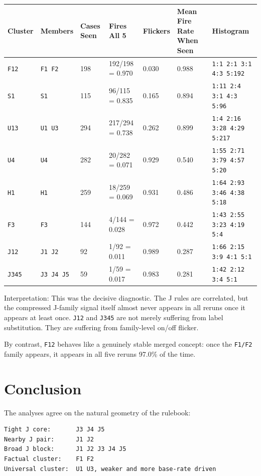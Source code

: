 \documentclass[11pt]{article}
\begin{document}
\begingroup
\small
\begin{longtable}{L{0.10\textwidth} L{0.12\textwidth} R{0.09\textwidth} R{0.16\textwidth} R{0.09\textwidth} R{0.13\textwidth} L{0.22\textwidth}}
\toprule
Cluster & Members & Cases Seen & Fires All 5 & Flickers & Mean Fire Rate When Seen & Histogram \\
\midrule
\endhead
\texttt{F12} & \texttt{F1 F2} & 198 & 192/198 = 0.970 & 0.030 & 0.988 & \texttt{1:1 2:1 3:1 4:3 5:192} \\
\texttt{S1} & \texttt{S1} & 115 & 96/115 = 0.835 & 0.165 & 0.894 & \texttt{1:11 2:4 3:1 4:3 5:96} \\
\texttt{U13} & \texttt{U1 U3} & 294 & 217/294 = 0.738 & 0.262 & 0.899 & \texttt{1:4 2:16 3:28 4:29 5:217} \\
\texttt{U4} & \texttt{U4} & 282 & 20/282 = 0.071 & 0.929 & 0.540 & \texttt{1:55 2:71 3:79 4:57 5:20} \\
\texttt{H1} & \texttt{H1} & 259 & 18/259 = 0.069 & 0.931 & 0.486 & \texttt{1:64 2:93 3:46 4:38 5:18} \\
\texttt{F3} & \texttt{F3} & 144 & 4/144 = 0.028 & 0.972 & 0.442 & \texttt{1:43 2:55 3:23 4:19 5:4} \\
\texttt{J12} & \texttt{J1 J2} & 92 & 1/92 = 0.011 & 0.989 & 0.287 & \texttt{1:66 2:15 3:9 4:1 5:1} \\
\texttt{J345} & \texttt{J3 J4 J5} & 59 & 1/59 = 0.017 & 0.983 & 0.281 & \texttt{1:42 2:12 3:4 5:1} \\
\bottomrule
\end{longtable}
\endgroup

Interpretation: This was the decisive diagnostic. The J rules are correlated, but the compressed J-family signal itself almost never appears in all reruns once it appears at least once. \texttt{J12} and \texttt{J345} are not merely suffering from label substitution. They are suffering from family-level on/off flicker.

By contrast, \texttt{F12} behaves like a genuinely stable merged concept: once the \texttt{F1/F2} family appears, it appears in all five reruns 97.0\% of the time.

\section*{Conclusion}

The analyses agree on the natural geometry of the rulebook:

\begin{verbatim}
Tight J core:       J3 J4 J5
Nearby J pair:      J1 J2
Broad J block:      J1 J2 J3 J4 J5
Factual cluster:    F1 F2
Universal cluster:  U1 U3, weaker and more base-rate driven
\end{verbatim}
\end{document}
